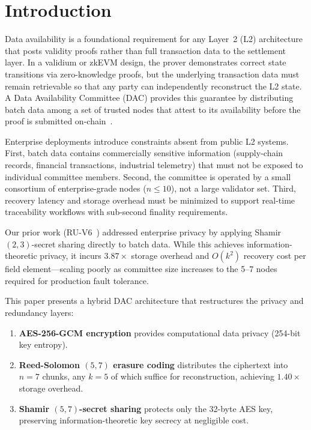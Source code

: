 
\section{Introduction}
\label{sec:introduction}

Data availability is a foundational requirement for any Layer~2 (L2)
architecture that posts validity proofs rather than full transaction data
to the settlement layer. In a validium or zkEVM design, the prover
demonstrates correct state transitions via zero-knowledge proofs, but the
underlying transaction data must remain retrievable so that any party can
independently reconstruct the L2 state. A Data Availability Committee
(DAC) provides this guarantee by distributing batch data among a set of
trusted nodes that attest to its availability before the proof is
submitted on-chain~\cite{starkware2023da, albassam2018fraud}.

Enterprise deployments introduce constraints absent from public L2
systems. First, batch data contains commercially sensitive information
(supply-chain records, financial transactions, industrial telemetry) that
must not be exposed to individual committee members. Second, the
committee is operated by a small consortium of enterprise-grade nodes
($n \leq 10$), not a large validator set. Third, recovery latency and
storage overhead must be minimized to support real-time traceability
workflows with sub-second finality requirements.

Our prior work (RU-V6~\cite{ruv6}) addressed enterprise privacy by
applying Shamir $(2,3)$-secret sharing directly to batch data. While
this achieves information-theoretic privacy, it incurs $3.87\times$
storage overhead and $O(k^2)$ recovery cost per field element---scaling
poorly as committee size increases to the 5--7 nodes required for
production fault tolerance.

This paper presents a hybrid DAC architecture that restructures the
privacy and redundancy layers:

\begin{enumerate}
  \item \textbf{AES-256-GCM encryption} provides computational data
    privacy (254-bit key entropy).
  \item \textbf{Reed-Solomon $(5,7)$ erasure coding} distributes the
    ciphertext into $n = 7$ chunks, any $k = 5$ of which suffice for
    reconstruction, achieving $1.40\times$ storage overhead.
  \item \textbf{Shamir $(5,7)$-secret sharing} protects only the 32-byte
    AES key, preserving information-theoretic key secrecy at negligible
    cost.
\end{enumerate}

